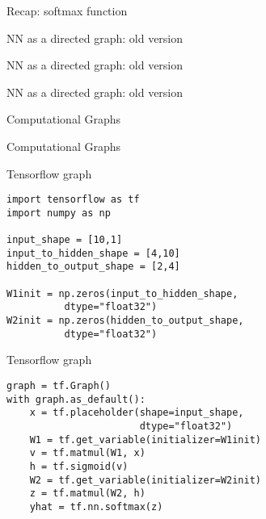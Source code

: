 \documentclass[10pt]{beamer}
\begin{document}
\begin{frame}[fragile]{Recap: softmax function}

\end{frame}

\begin{frame}[fragile]{NN as a directed graph: old version}

\end{frame}

\begin{frame}[fragile]{NN as a directed graph: old version}

\end{frame}

\begin{frame}[fragile]{NN as a directed graph: old version}
\begin{center}

\end{center}
\end{frame}

\begin{frame}[fragile]{Computational Graphs}

\end{frame}

\begin{frame}[fragile]{Computational Graphs}

\end{frame}



\begin{frame}[fragile]{Tensorflow graph}
\begin{verbatim}
import tensorflow as tf
import numpy as np

input_shape = [10,1]
input_to_hidden_shape = [4,10]
hidden_to_output_shape = [2,4]

W1init = np.zeros(input_to_hidden_shape,
          dtype="float32")
W2init = np.zeros(hidden_to_output_shape,
          dtype="float32")
\end{verbatim}
\end{frame}


\begin{frame}[fragile]{Tensorflow graph}
\begin{verbatim}
graph = tf.Graph() 
with graph.as_default():
    x = tf.placeholder(shape=input_shape,
                       dtype="float32") 
    W1 = tf.get_variable(initializer=W1init)
    v = tf.matmul(W1, x)
    h = tf.sigmoid(v)
    W2 = tf.get_variable(initializer=W2init)
    z = tf.matmul(W2, h)
    yhat = tf.nn.softmax(z)
\end{verbatim}
\end{frame}
\end{document}
